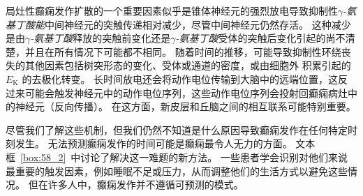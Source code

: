 局灶性癫痫发作扩散的一个重要因素似乎是锥体神经元的强烈放电导致抑制性\textit{$\gamma$-氨基丁酸能}中间神经元的突触传递相对减少，尽管中间神经元仍然存活。
这种减少是由\textit{$\gamma$-氨基丁酸}释放的突触前变化还是\textit{$\gamma$-氨基丁酸}受体的突触后变化引起的尚不清楚，并且在所有情况下可能都不相同。
随着时间的推移，可能导致抑制性环绕丧失的其他因素包括树突形态的变化、受体或通道的密度，或由细胞外  积累引起的 $ E_\text{K} $ 的去极化转变。
长时间放电还会将动作电位传输到大脑中的远端位置，这反过来可能会触发神经元中的动作电位序列，这些动作电位序列会投射回癫痫病灶中的神经元（反向传播）。
在这方面，新皮层和丘脑之间的相互联系可能特别重要。


尽管我们了解这些机制，但我们仍然不知道是什么原因导致癫痫发作在任何特定时刻发生。
无法预测癫痫发作的时间可能是癫痫最令人无力的方面。
文本框~\ref{box:58_2}~中讨论了解决这一难题的新方法。
一些患者学会识别对他们来说最重要的触发因素，例如睡眠不足或压力，从而调整他们的生活方式以避免这些情况。
但在许多人中，癫痫发作并不遵循可预测的模式。


